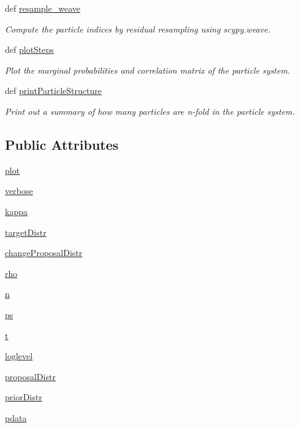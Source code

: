 \begin{CompactItemize}
def \hyperlink{classsmc_1_1smc_75f94a2618bc58ed2cc419dc36817ff9}{resample\_\-weave}
\begin{CompactList}\small\item\em Compute the particle indices by residual resampling using scypy.weave. \item\end{CompactList}\item 
def \hyperlink{classsmc_1_1smc_462f5030ead3c90a3d7be5419a0539b6}{plotSteps}
\begin{CompactList}\small\item\em Plot the marginal probabilities and correlation matrix of the particle system. \item\end{CompactList}\item 
def \hyperlink{classsmc_1_1smc_485fc39676c507c373e922a124f51748}{printParticleStructure}
\begin{CompactList}\small\item\em Print out a summary of how many particles are n-fold in the particle system. \item\end{CompactList}\end{CompactItemize}
\subsection*{Public Attributes}
\begin{CompactItemize}
\item 
\hyperlink{classsmc_1_1smc_e3829faa0fc80c586754db6ff6be0e21}{plot}
\item 
\hyperlink{classsmc_1_1smc_38c24613680356068405f403b837c4c5}{verbose}
\item 
\hyperlink{classsmc_1_1smc_c63ef54a10ca8d071ccb44851861074d}{kappa}
\item 
\hyperlink{classsmc_1_1smc_30edcc21d770d259d6985d4b79c6d95d}{targetDistr}
\item 
\hyperlink{classsmc_1_1smc_927a6dd0b643bac0c5cadf396389b44d}{changeProposalDistr}
\item 
\hyperlink{classsmc_1_1smc_6162e817e2c67350cc277006bdb05b31}{rho}
\item 
\hyperlink{classsmc_1_1smc_44b55c368632379dd23476a13ff2c7e5}{n}
\item 
\hyperlink{classsmc_1_1smc_6487e2a8d1dd4e355f689c0a6ef2ddae}{ps}
\item 
\hyperlink{classsmc_1_1smc_0478d6b05231542beed9a2aa7c7cf1b6}{t}
\item 
\hyperlink{classsmc_1_1smc_21babd9a1ec1e969dd9ae3cc62c6dd1d}{loglevel}
\item 
\hyperlink{classsmc_1_1smc_55ec911b9b714e1103220453efe648be}{proposalDistr}
\item 
\hyperlink{classsmc_1_1smc_09b83207e06db24e39c512371d100485}{priorDistr}
\item 
\hyperlink{classsmc_1_1smc_1ee6881c16f30b39c30b365d3aeeb5f1}{pdata}
\end{CompactItemize}


